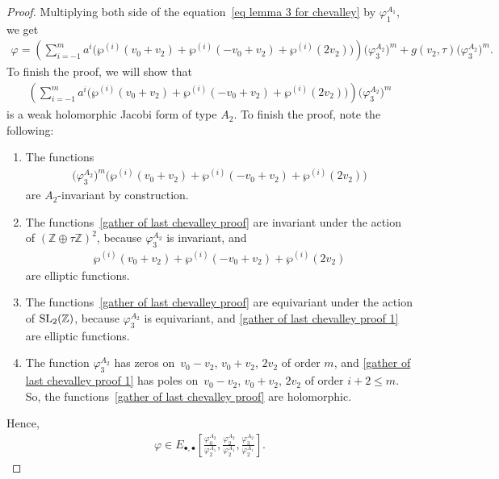 \documentclass[10pt,a4paper]{amsart}
\numberwithin{equation}{section}
\begin{document}
\begin{proof}
Multiplying both side of the equation~\eqref{eq lemma 3 for chevalley} by $\varphi_1^{A_1}$, we get
\begin{gather*}%
\varphi= \left(\sum_{i=-1}^{m}\! a^i\big(\wp^{(i)}(v_0+v_{2})+\wp^{(i)}(-v_0+v_{2})+\wp^{(i)}(2v_2)\big)\! \right) \big(\varphi_3^{A_2}\big)^m +g(v_2,\tau) \big(\varphi_3^{A_2}\big)^m\!.\!\!
\end{gather*}
To finish the proof, we will show that
\begin{gather*}
 \left(\sum_{i=-1}^{m} a^i\big(\wp^{(i)}(v_0+v_{2})+\wp^{(i)}(-v_0+v_{2})+\wp^{(i)}(2v_2)\big) \right) \big(\varphi_3^{A_2}\big)^m
\end{gather*}
is a weak holomorphic Jacobi form of type $A_2$. To finish the proof, note the following:
\begin{enumerate}\itemsep=0pt
\item The functions
\begin{gather}\label{gather of last chevalley proof}
\big(\varphi_{3}^{A_2}\big)^m\big(\wp^{(i)}(v_0+v_{2})+\wp^{(i)}(-v_0+v_{2})+\wp^{(i)}(2v_2)\big)
\end{gather}
 are $A_{2}$-invariant by construction.
\item The functions~\eqref{gather of last chevalley proof} are invariant under the action of $(\mathbb{Z}\oplus\tau\mathbb{Z})^{2}$, because $\varphi_{3}^{A_{2}}$ is invariant, and
\begin{gather}\label{gather of last chevalley proof 1}
\wp^{(i)}(v_0+v_{2})+\wp^{(i)}(-v_0+v_{2})+\wp^{(i)}(2v_2)
\end{gather}
 are elliptic functions.
\item The functions~\eqref{gather of last chevalley proof} are equivariant under the action of ${\rm SL}_2(\mathbb{Z})$, because $\varphi_{3}^{A_{2}}$ is equivariant, and
\eqref{gather of last chevalley proof 1} are elliptic functions.
\item The function $\varphi_{3}^{A_{2}}$ has zeros on~$v_0-v_2$, $v_0+v_2$, $2v_2$ of order $m$, and
\eqref{gather of last chevalley proof 1} has poles on~$v_0-v_2$, $v_0+v_2$, $2v_2$ of order $i+2\leq m$. So, the functions~\eqref{gather of last chevalley proof} are holomorphic.
\end{enumerate}
Hence,
\begin{gather*}
\varphi \in E_{\bullet,\bullet}\left[\frac{\varphi_0^{A_{2}}} {\varphi_2^{A_1}},\frac{\varphi_2^{A_{2}}}{\varphi_2^{A_1}},\frac{\varphi_3^{A_{2}}}{\varphi_2^{A_1}}\right].
\tag*{\qed}
\end{gather*}\renewcommand{\qed}{}
\end{proof}
\end{document}
